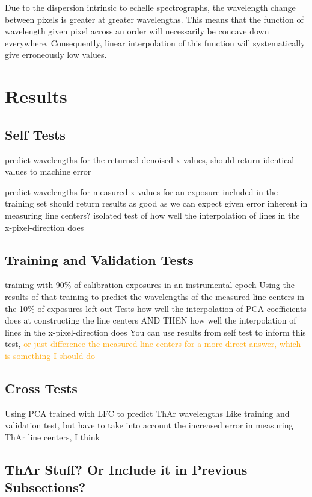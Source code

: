 \documentclass[12pt, letterpaper]{article}
\newcommand{\lz}[1]{\textcolor{orange}{#1}}
\begin{document}
Due to the dispersion intrinsic to echelle spectrographs, the wavelength change between pixels is greater at greater wavelengths.  This means that the function of wavelength given pixel across an order will necessarily be concave down everywhere.  Consequently, linear interpolation of this function will systematically give erroneously low values.

\section{Results}
\subsection{Self Tests}
predict wavelengths for the returned denoised x values, should return identical values to machine error

predict wavelengths for measured x values for an exposure included in the training set
should return results as good as we can expect given error inherent in measuring line centers?
isolated test of how well the interpolation of lines in the x-pixel-direction does

\subsection{Training and Validation Tests}
training with 90\% of calibration exposures in an instrumental epoch
Using the results of that training to predict the wavelengths of the measured line centers in the 10\% of exposures left out
Tests how well the interpolation of PCA coefficients does at constructing the line centers AND THEN how well the interpolation of lines in the x-pixel-direction does
You can use results from self test to inform this test, \lz{or just difference the measured line centers for a more direct answer, which is something I should do}

\subsection{Cross Tests}
Using PCA trained with LFC to predict ThAr wavelengths
Like training and validation test, but have to take into account the increased error in measuring ThAr line centers, I think

\subsection{ThAr Stuff?  Or Include it in Previous Subsections?}
\end{document}
